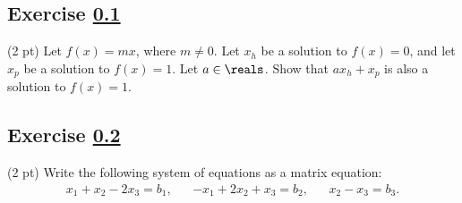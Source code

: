 \subsection{Exercise \ref{sec : Algebra Q2}}
\label{sec : Algebra Q2}

(2 pt) Let $f(x) = m x$, where $m \neq 0$. Let $x_{h}$ be a solution to $f(x) = 0$, and let $x_{p}$ be a solution to $f(x) = 1$. Let $a \in \reals$. Show that $a x_{h} + x_{p}$ is also a solution to $f(x) = 1$.




\newpage

\subsection{Exercise \ref{sec : Algebra Q3}}
\label{sec : Algebra Q3}


(2 pt) Write the following system of equations as a matrix equation:
\begin{align*}
x_{1} + x_{2} - 2 x_{3}
=
b_{1},
&&
-x_{1} + 2 x_{2} + x_{3}
=
b_{2},
&&
x_{2} - x_{3}
=
b_{3}.
\end{align*}




